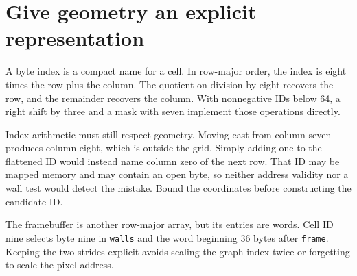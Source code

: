 \section{Give geometry an explicit representation}\label{maze-p01}

A byte index is a compact name for a cell. In row-major order, the index is eight times the row plus the column. The quotient on division by eight recovers the row, and the remainder recovers the column. With nonnegative IDs below 64, a right shift by three and a mask with seven implement those operations directly.

Index arithmetic must still respect geometry. Moving east from column seven produces column eight, which is outside the grid. Simply adding one to the flattened ID would instead name column zero of the next row. That ID may be mapped memory and may contain an open byte, so neither address validity nor a wall test would detect the mistake. Bound the coordinates before constructing the candidate ID.

The framebuffer is another row-major array, but its entries are words. Cell ID nine selects byte nine in \texttt{walls} and the word beginning 36 bytes after \texttt{frame}. Keeping the two strides explicit avoids scaling the graph index twice or forgetting to scale the pixel address.
